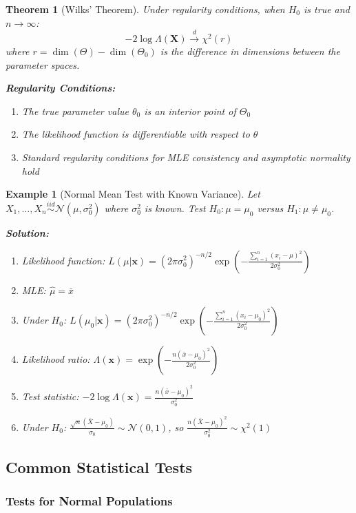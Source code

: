 \documentclass[12pt,a4paper]{article}
\newtheorem{theorem}{Theorem}[section]
\newtheorem{example}{Example}[section]
\theoremstyle{remark}
\begin{document}
\begin{theorem}[Wilks' Theorem]
Under regularity conditions, when $H_0$ is true and $n \to \infty$:
$$-2\log\Lambda(\mathbf{X}) \stackrel{d}{\to} \chi^2(r)$$
where $r = \dim(\Theta) - \dim(\Theta_0)$ is the difference in dimensions between the parameter spaces.

\textbf{Regularity Conditions:}
\begin{enumerate}
\item The true parameter value $\theta_0$ is an interior point of $\Theta_0$
\item The likelihood function is differentiable with respect to $\theta$
\item Standard regularity conditions for MLE consistency and asymptotic normality hold
\end{enumerate}
\end{theorem}

\begin{example}[Normal Mean Test with Known Variance]
Let $X_1, \ldots, X_n \stackrel{iid}{\sim} \mathcal{N}(\mu, \sigma_0^2)$ where $\sigma_0^2$ is known. Test $H_0: \mu = \mu_0$ versus $H_1: \mu \neq \mu_0$.

\textbf{Solution:}
\begin{enumerate}
\item Likelihood function: $L(\mu|\mathbf{x}) = (2\pi\sigma_0^2)^{-n/2} \exp\left(-\frac{\sum_{i=1}^n(x_i-\mu)^2}{2\sigma_0^2}\right)$
\item MLE: $\hat{\mu} = \bar{x}$
\item Under $H_0$: $L(\mu_0|\mathbf{x}) = (2\pi\sigma_0^2)^{-n/2} \exp\left(-\frac{\sum_{i=1}^n(x_i-\mu_0)^2}{2\sigma_0^2}\right)$
\item Likelihood ratio: $\Lambda(\mathbf{x}) = \exp\left(-\frac{n(\bar{x}-\mu_0)^2}{2\sigma_0^2}\right)$
\item Test statistic: $-2\log\Lambda(\mathbf{x}) = \frac{n(\bar{x}-\mu_0)^2}{\sigma_0^2}$
\item Under $H_0$: $\frac{\sqrt{n}(\bar{X}-\mu_0)}{\sigma_0} \sim \mathcal{N}(0,1)$, so $\frac{n(\bar{X}-\mu_0)^2}{\sigma_0^2} \sim \chi^2(1)$
\end{enumerate}
\end{example}

\subsection{Common Statistical Tests}

\subsubsection{Tests for Normal Populations}
\end{document}
